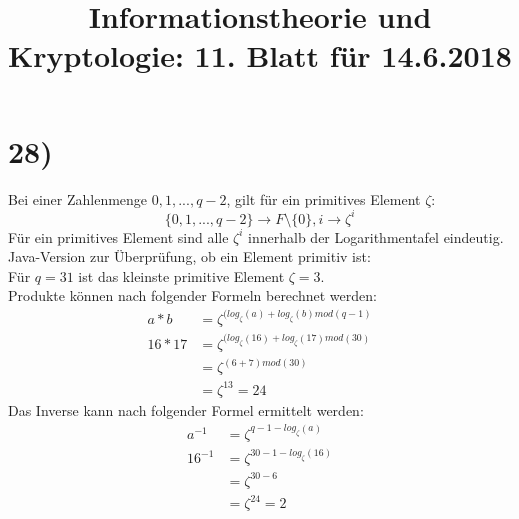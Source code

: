 %



  \title{Informationstheorie und Kryptologie: 11. Blatt für 14.6.2018}
  \maketitle

  \section*{28)}

    Bei einer Zahlenmenge ${0, 1, ..., q-2}$, gilt für ein primitives Element $\zeta$:
    \[ \{ 0, 1, ..., q-2 \} \to F \setminus \{ 0 \} , i \to \zeta^i \]
    Für ein primitives Element sind alle $\zeta^i$ innerhalb der Logarithmentafel eindeutig.\\
    Java-Version zur Überprüfung, ob ein Element primitiv ist:\\
    
    
    Für $q = 31$ ist das kleinste primitive Element $\zeta = 3$.\\
    Produkte können nach folgender Formeln berechnet werden:
    \begin{equation}
      \begin{split}
        a*b & = \zeta^{(log_\zeta(a)+log_\zeta(b) mod (q-1)} \\
        16*17 & = \zeta^{(log_\zeta(16)+log_\zeta(17) mod (30)} \\
        & = \zeta^{(6+7) mod (30)} \\
        & = \zeta^{13} = 24
      \end{split}
    \end{equation}
    Das Inverse kann nach folgender Formel ermittelt werden:
    \begin{equation}
      \begin{split}
        a^{-1} & = \zeta^{q-1-log_\zeta(a)} \\
        16^{-1} & = \zeta^{30-1-log_\zeta(16)} \\
        & = \zeta^{30-6} \\
        & = \zeta^{24} = 2
      \end{split}
    \end{equation}
        
